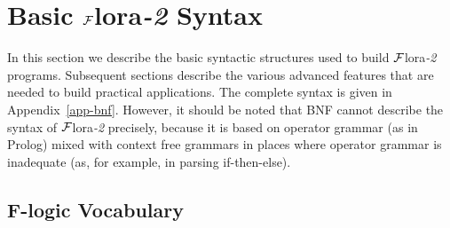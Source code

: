 \documentclass[11pt]{article}
\newcommand{\FLSYSTEM}{{\mbox{\sc ${\cal F}${lora}\rm\emph{-2}}}\xspace}
\newcommand{\fl}{\mbox{F-logic}\xspace}
\begin{document}
\section{Basic \FLSYSTEM Syntax}

In this section we describe the basic syntactic structures used to build
\FLSYSTEM programs. Subsequent sections describe the various advanced features
that are needed to build practical applications. The complete syntax is
given in Appendix~\ref{app-bnf}. However, it should be noted that BNF
cannot describe the syntax of \FLSYSTEM precisely, because it is based on
operator grammar (as in Prolog) mixed with context free grammars in
places where operator grammar is inadequate (as, for example, in parsing
if-then-else).

\subsection{\fl Vocabulary}\label{sec-basic-flogic}
\end{document}
